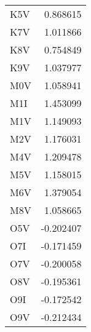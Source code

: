 \begin{tabular}{lr}
K5V  &  0.868615 \\
K7V  &  1.011866 \\
K8V  &  0.754849 \\
K9V  &  1.037977 \\
M0V  &  1.058941 \\
M1I  &  1.453099 \\
M1V  &  1.149093 \\
M2V  &  1.176031 \\
M4V  &  1.209478 \\
M5V  &  1.158015 \\
M6V  &  1.379054 \\
M8V  &  1.058665 \\
O5V  & -0.202407 \\
O7I  & -0.171459 \\
O7V  & -0.200058 \\
O8V  & -0.195361 \\
O9I  & -0.172542 \\
O9V  & -0.212434 \\
\bottomrule
\end{tabular}

